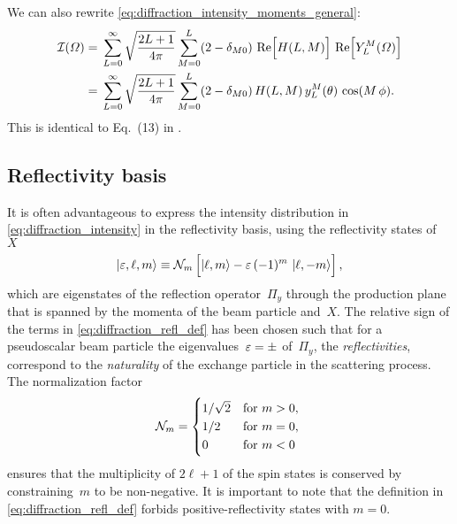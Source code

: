 We can also rewrite \cref{eq:diffraction_intensity_moments_general}:
\begin{align}
  \intensity(\Omega)
  ={}& \sum_{L = 0}^\infty \sqrt{\frac{2 L + 1}{4 \pi}} \sum_{M = 0}^{L} (2 - \delta_{M 0})\, \Re[2]{H(L, M)}\, \Re[2]{Y_L^M(\Omega)} \nonumber
  \\
  \label{eq:diffraction_intensity_moments_real}
  ={}& \sum_{L = 0}^\infty \sqrt{\frac{2 L + 1}{4 \pi}} \sum_{M = 0}^{L} (2 - \delta_{M 0})\, H(L, M)\, y_L^M(\theta)\, \cos(M\, \phi).
\end{align}
This is identical to Eq.~(13) in .


\subsection{Reflectivity basis}%
\label{sec:diffraction:reflectivity}

It is often advantageous to express the intensity distribution in
\cref{eq:diffraction_intensity} in the reflectivity basis, \ie using
the reflectivity states of~$X$
\begin{equation}
  \label{eq:diffraction_refl_def}
  \ket{\refl, \ell, m}
  \equiv \mathcal{N}_m \sBrk[2]{\ket{\ell, m} - \refl\, (-1)^m\, \ket{\ell, {-m}}},
\end{equation}
which are eigenstates of the reflection operator~$\Pi_y$ through the
production plane that is spanned by the momenta of the beam particle
and~$X$.  The relative sign of the terms in
\cref{eq:diffraction_refl_def} has been chosen such that for a
pseudoscalar beam particle the eigenvalues~$\varepsilon = \pm$ of~$\Pi_y$,
\ie the \emph{reflectivities}, correspond to the \emph{naturality} of
the exchange particle in the scattering process.  The normalization
factor
\begin{equation}
  \label{eq:refl_norm}
  \mathcal{N}_m
  = \begin{cases*}
      1 / \sqrt{2} & for $m > 0$, \\
      1 / 2        & for $m = 0$, \\
      0            & for $m < 0$
    \end{cases*}
\end{equation}
ensures that the multiplicity of $2 \ell + 1$ of the spin states is
conserved by constraining~$m$ to be non-negative.  It is important to
note that the definition in \cref{eq:diffraction_refl_def} forbids
positive-reflectivity states with $m = 0$.

